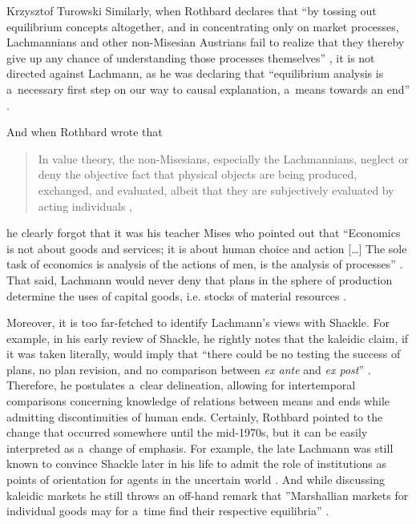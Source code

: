 \begin{artengenv}{Krzysztof Turowski}
Similarly, when Rothbard declares that ``by tossing out equilibrium concepts altogether, and in concentrating only on market processes, Lachmannians and other non-Misesian Austrians fail to realize that they thereby give up any chance of understanding those processes themselves'' \parencite[57]{rothbard-present}, it is not directed against Lachmann, as he was declaring that ``equilibrium analysis is a~necessary first step on our way to causal explanation, a~means towards an end'' \parencite[198]{lachmann-hayek}.

And when Rothbard wrote that
\begin{quote}
In value theory, the non-Misesians, especially the Lachmannians, neglect or deny the objective fact that physical objects are being produced, exchanged, and evaluated, albeit that they are subjectively evaluated by acting individuals \parencite[50]{rothbard-present},
\end{quote}
he clearly forgot that it was his teacher Mises who pointed out that ``Economics is not about goods and services; it is about human choice and action [\ldots] The sole task of economics is analysis of the actions of men, is the analysis of processes'' \parencite[354]{mises-ha}.
That said, Lachmann would never deny that plans in the sphere of production determine the uses of capital goods, i.e. stocks of material resources \parencite[for example in][10--11]{lachmann1956capital}.

Moreover, it is too far-fetched to identify Lachmann's views with Shackle. For example, in his early review of Shackle, he rightly notes that the kaleidic claim, if it was taken literally, would imply that ``there could be no testing the success of plans, no plan revision, and no comparison between \emph{ex ante} and \emph{ex post}'' \parencite[84]{lachmann-shackle-time}. Therefore, he postulates a~clear delineation, allowing for intertemporal comparisons concerning knowledge of relations between means and ends while admitting discontinuities of human ends.
Certainly, Rothbard pointed to the change that occurred somewhere until the mid-1970s, but it can be easily interpreted as a~change of emphasis.
For example, the late Lachmann was still known to convince Shackle later in his life to admit the role of institutions as points of orientation for agents in the uncertain world \parencite[in][31]{dekker-lachmann}.
And while discussing kaleidic markets he still throws an off-hand remark that ''Marshallian markets for individual goods may for a~time find their respective equilibria'' \parencite[61]{lachmann-kaleidic}.


\end{artengenv}
